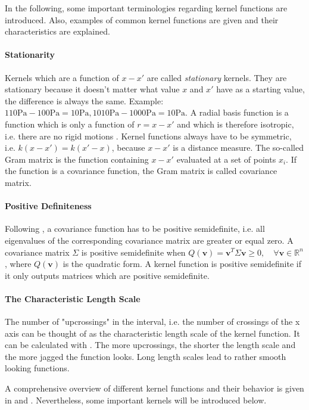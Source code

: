 \documentclass[%
  a4paper,oneside,%
  11pt,%
  smallchapters,
  style=printdev,
  extramargin,
  green,%
  rgb, <cmyk>
  ]{tubsbook}
\begin{document}
In the following, some important terminologies regarding kernel functions are introduced. Also, examples of common kernel functions are given and their characteristics are explained.

\paragraph{Stationarity}
Kernels which are a function of $x-x'$ are called \emph{stationary} kernels. They are stationary because it doesn't matter what value $x$ and $x'$ have as a starting value, the difference is always the same. Example: $110\mathrm{Pa} -100\mathrm{Pa} = 10\mathrm{Pa}, 1010\mathrm{Pa}-1000\mathrm{Pa} = 10\mathrm{Pa}$.
%
A radial basis function is a function which is only a function of $r=x-x'$ and which is therefore isotropic, i.e. there are no rigid motions \cite[p.80]{rasmussen2006}. 
Kernel functions always have to be symmetric, i.e. $k(x-x') = k(x'-x)$, because $x-x'$ is a distance measure.
The so-called Gram matrix is the function containing $x-x'$ evaluated at a set of points $x_i$. If the function is a covariance function, the Gram matrix is called covariance matrix.


\paragraph{Positive Definiteness} Following \cite[pp. 79, 80]{rasmussen2006}, a covariance function has to be positive semidefinite, i.e. all eigenvalues of the corresponding covariance matrix are greater or equal zero. A covariance matrix $\Sigma$ is positive semidefinite when $Q(\bm{v}) = \bm{v}^T \Sigma \bm{v} \geq 0, \quad \forall \bm{v} \in \mathbb{R}^n$, where $Q(\bm{v})$ is the quadratic form. A kernel function is positive semidefinite if it only outputs matrices which are positive semidefinite. 


\paragraph{The Characteristic Length Scale} The number of "upcrossings" in the interval, i.e. the number of crossings of the x axis can be thought of as the characteristic length scale of the kernel function. It can be calculated with \cite[Eq. 4.3]{rasmussen2006}. The more upcrossings, the shorter the length scale and the more jagged the function looks. Long length scales lead to rather smooth looking functions.

A comprehensive overview of different kernel functions and their behavior is given in \cite{Duvenaud} and \cite{gortler2019}. Nevertheless, some important kernels will be introduced below.
%
\end{document}
